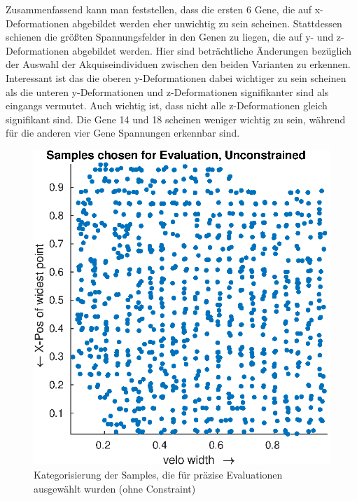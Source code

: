 Zusammenfassend kann man feststellen, dass die ersten 6 Gene, die auf x-Deformationen abgebildet werden eher unwichtig zu sein scheinen.
Stattdessen schienen die größten Spannungsfelder in den Genen zu liegen, die auf y- und z-Deformationen abgebildet werden.
Hier sind beträchtliche Änderungen bezüglich der Auswahl der Akquiseindividuen zwischen den beiden Varianten zu erkennen.
Interessant ist das die oberen y-Deformationen dabei wichtiger zu sein scheinen als die unteren y-Deformationen und z-Deformationen signifikanter sind als eingangs vermutet.
Auch wichtig ist, dass nicht alle z-Deformationen gleich signifikant sind.
Die Gene 14 und 18 scheinen weniger wichtig zu sein, während für die anderen vier Gene Spannungen erkennbar sind.

\begin{figure}[h]
	\centering
	\begin{minipage}{0.45\textwidth}
		\centering
		\includegraphics[width=1\linewidth]{bilder/6pt1000Samples/acqSamplesUncon}
		\caption{Kategorisierung der Samples, die für präzise Evaluationen ausgewählt wurden (ohne Constraint)}
		\label{fig:acqSamplesUncon}
	\end{minipage}\hfill
	\begin{minipage}{0.45\textwidth}
		\centering

\end{minipage}
\end{figure}
